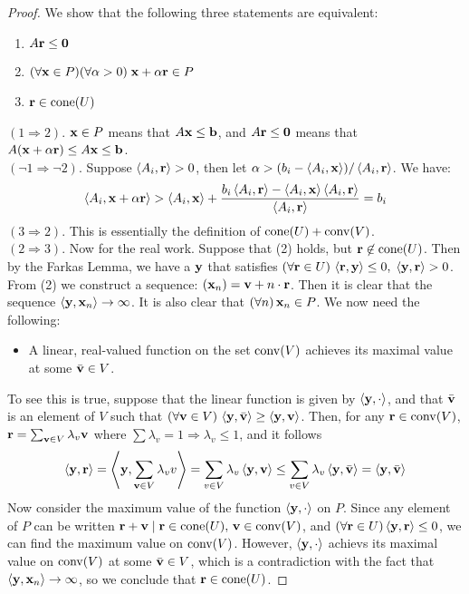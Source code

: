 \begin{proof}
	We show that the following three statements are equivalent:
	\begin{enumerate}
		\item $A\r\leq\0$
		\item $(\forall \x\in P)(\forall \alpha > 0)\;\x + \alpha\r \in P$
		\item $\r \in \cone(U)$
	\end{enumerate}
	$(1 \Rightarrow 2)$. $\x\in P$ means that $A\x\leq\b$, and $A\r\leq\0$ means that $A(\x+\alpha\r) \leq A\x \leq \b$.\\
	$(\neg 1 \Rightarrow \neg 2)$.  Suppose $\ip{A_i}{\r} > 0$, then let $\alpha > (b_i - \ip{A_i}{\x})/\ip{A_i}{\r}$.  We have:
	\[ \ip{A_i}{\x + \alpha\r} > \ip{A_i}{\x} +
		\frac{b_i\ip{A_i}{\r} - \ip{A_i}{\x}\ip{A_i}{\r}}{\ip{A_i}{\r}} = b_i \]
	$(3 \Rightarrow 2)$.  This is essentially the definition of $\VP{U}{V}$.\\
	$(2 \Rightarrow 3)$.  Now for the real work.  Suppose that (2) holds, but $\r\not\in\cone(U)$.  Then by the Farkas Lemma, we have a $\y$ that satisfies $(\forall \r\in U)\,\ip{\r}{\y}\leq 0,\; \ip{\y}{\r} > 0$.  From (2) we construct a sequence: $(\x_n) = \v+n\cdot\r$.  Then it is clear that the sequence $\ip{\y}{\x_n} \to \infty$.  It is also clear that $(\forall n)\,\x_n \in P$.  We now need the following:
	\begin{itemize}
		\item A linear, real-valued function on the set $\conv(V)$ achieves its maximal value at some $\bar\v \in V$.
	\end{itemize}
	To see this is true, suppose that the linear function is given by $\ip{\y}{\cdot}$, and that $\bar\v$ is an element of $V$ such that $(\forall \v \in V)\,\ip{\y}{\bar\v} \geq \ip{\y}{\v}$.  Then, for any $\r \in \conv(V)$, $\r = \sum_{\v\in V} \lambda_v\v$ where $\sum \lambda_v = 1 \Rightarrow \lambda_v \leq 1$, and it follows
	\[\ip{\y}{\r} = \ip{\y}{\sum_{\v\in V}\lambda_v v} = \sum_{v\in V} \lambda_v\ip{\y}{\v}
		\leq \sum_{v\in V}\lambda_v\ip{\y}{\bar\v} = \ip{\y}{\bar\v} \]
	Now consider the maximum value of the function $\ip{\y}{\cdot}$ on $P$.  Since any element of $P$ can be written $\r + \v \st \r\in\cone(U),\,\v\in\conv(V)$, and $(\forall\r\in U) \ip{\y}{\r} \leq 0$, we can find the maximum value on $\conv(V)$.  However, $\ip{\y}{\cdot}$ achievs its maximal value on $\conv(V)$ at some $\bar\v\in V$, which is a contradiction with the fact that $\ip{\y}{\x_n} \to \infty$, so we conclude that $\r\in\cone(U)$.
\end{proof}

